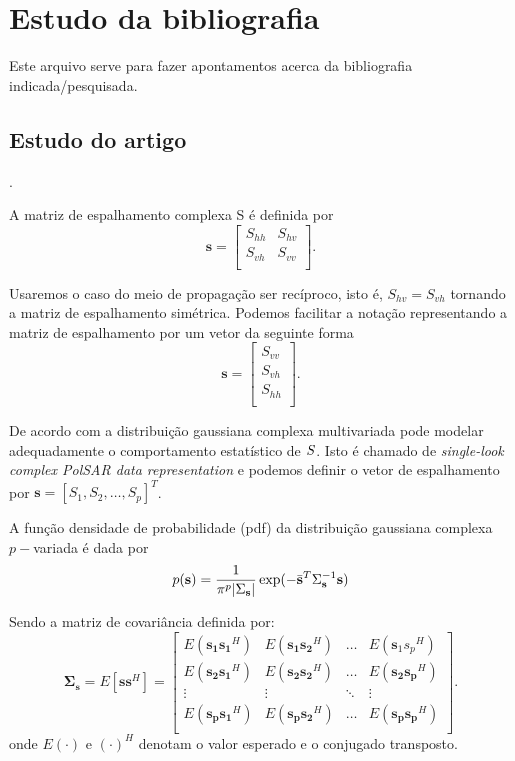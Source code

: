 \documentclass[12pt,a4paper]{article}
\begin{document}
\section{Estudo da bibliografia}

Este arquivo serve para fazer apontamentos acerca da bibliografia indicada/pesquisada.

\subsection{Estudo do artigo~\cite{lee94}}.

A matriz de espalhamento complexa {\boldmath S} é definida por
$$
\mathbf{ s} = \left[
\begin{array}{cc}
	S_{hh}   & S_{hv}   \\
	S_{vh}   & S_{vv}   \\
\end{array}
\right].
$$

Usaremos o caso do meio de propagação ser recíproco, isto é, $S_{hv}=S_{vh}$ tornando a matriz de espalhamento simétrica. Podemos facilitar a notação representando a matriz de espalhamento por um vetor da seguinte forma
$$
\mathbf{s} = \left[
\begin{array}{c}
	S_{vv}      \\
	S_{vh}     \\
	S_{hh}      \\
\end{array}
\right].
$$

De acordo com \cite{goodman1963} a distribuição gaussiana complexa multivariada pode modelar adequadamente o comportamento estatístico de $\boldmath S$. Isto é chamado de {\it single-look complex PolSAR data representation} e podemos definir o vetor de espalhamento por $\mathbf{s}=[S_1,S_2,\dots,S_p]^T$. 

A função densidade de probabilidade ({\boldmath pdf}) da distribuição gaussiana complexa $p-$variada é dada por
\begin{equation}\label{eqn1}
	p(\mathbf{s})=\frac{1}{\pi^p|\Sigma_{\mathbf{s}}|}\exp(-\bar{\mathbf{s}}^{T}\Sigma_{\mathbf{s}}^{-1}\mathbf{s})  \\
\end{equation}

Sendo a matriz de covariância definida por:
\begin{equation}\label{eqn2}
	\mathbf{ \Sigma_{s}} = E[\mathbf{ss}^H] = \left[
\begin{array}{cccc}
	E(\mathbf{s_1s_1}^H)  & E(\mathbf{s_1s_2}^H) &\hdots & E({\mathbf s_1s_p}^H) \\
	E(\mathbf{ s_2s_1}^H)  & E(\mathbf {s_2 s_2}^H) &\hdots &E(\mathbf {s_2 s_p}^H)\\
        \vdots&\vdots &\ddots &\vdots\\
	E(\mathbf{ s_ps_1}^H)  & E(\mathbf {s_ps_2}^H) &\hdots &E(\mathbf {s_ps_p}^H)\\
\end{array}
\right].
\end{equation}
onde $E(\cdot)$ e $(\cdot)^H$ denotam o valor esperado e o conjugado transposto.
\end{document}
